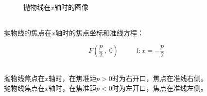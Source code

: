 \documentclass[UTF8]{ctexart}
\begin{document}
\begin{figure}[h!]
\begin{center}
{\begin{minipage}[t]{0.446\linewidth}
                \end{minipage}
            }
            \caption{抛物线在$x$轴时的图像}
        \end{center}
    \end{figure}\\
    抛物线的焦点在$x$轴时的焦点坐标和准线方程：\vspace{4pt}
    \begin{large}
        \begin{equation*}
            F\left(\frac{p}{2}~,~0\right)~~~~~~~~~~~~l:x=-\frac{p}{2}
        \end{equation*}
    \end{large}\\
    抛物线焦点在$x$轴时，在焦准距$p>0$时为右开口，焦点在准线右侧。\\[3mm]
    抛物线焦点在$x$轴时，在焦准距$p<0$时为左开口，焦点在准线左侧。\\[3mm]
    
\newpage
\end{document}
